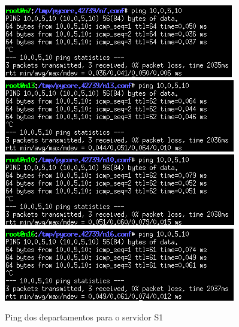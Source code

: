 \documentclass[11pt]{article}
\begin{document}
\begin{figure}[hbt!]
        \includegraphics[width=\linewidth]{images/parte2/depA.png}
        \centering
        \captionsetup{Departamento A}
    \endminipage\hfill
        \includegraphics[width=\linewidth]{images/parte2/depB.png}
        \centering
        \captionsetup{Departamento B}
    \endminipage
    \vspace{0.2cm}
        \includegraphics[width=\linewidth]{images/parte2/depC.png}
        \centering
        \captionsetup{Departamento C}
    \endminipage\hfill
        \includegraphics[width=\linewidth]{images/parte2/depD.png}
        \centering
        \captionsetup{Departamento D}
    \endminipage
    \caption{Ping dos departamentos para o servidor S1}
\end{figure}
\end{document}
